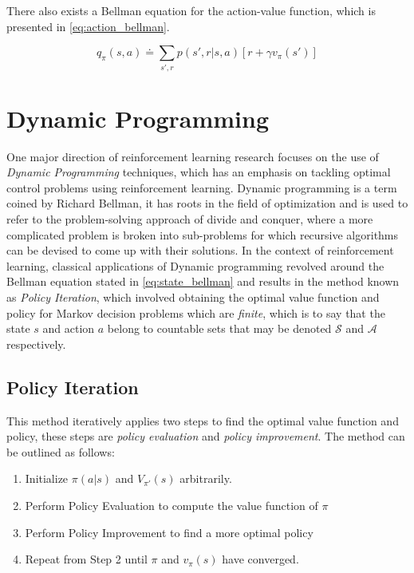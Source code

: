 \documentclass[../report.tex]{subfiles}
\begin{document}
There also exists a Bellman equation for the action-value function, which is presented in \autoref{eq:action_bellman}.

\begin{equation}\label{eq:action_bellman}
    q_{\pi}(s,a) \doteq \sum\limits_{s', r} p(s', r|s, a)[r + \gamma v_{\pi}(s')] 
\end{equation}

\section{Dynamic Programming}

One major direction of reinforcement learning research focuses on the use of \textit{Dynamic Programming} techniques, which has an emphasis on tackling optimal control problems using reinforcement learning\cite{rl_and_dp}. Dynamic programming is a term coined by Richard Bellman, it has roots in the field of optimization and is used to refer to the problem-solving approach of divide and conquer, where a more complicated problem is broken into sub-problems for which recursive algorithms can be devised to come up with their solutions\cite{dp}. In the context of reinforcement learning, classical applications of Dynamic programming revolved around the Bellman equation stated in \autoref{eq:state_bellman} and results in the method known as \textit{Policy Iteration}, which involved obtaining the optimal value function and policy for Markov decision problems which are \textit{finite}, which is to say that the state $s$ and action $a$ belong to countable sets that may be denoted $\mathcal{S}$ and $\mathcal{A}$ respectively.

\subsection{Policy Iteration}

This method iteratively applies two steps to find the optimal value function and policy, these steps are \textit{policy evaluation} and \textit{policy improvement}. The method can be outlined as follows:

\begin{enumerate}
    \item Initialize $\pi(a|s)$ and $V_{\pi'}(s)$ arbitrarily.
    \item Perform Policy Evaluation to compute the value function of $\pi$
    \item Perform Policy Improvement to find a more optimal policy 
    \item Repeat from Step 2 until $\pi$ and $v_{\pi}(s)$ have converged.
\end{enumerate}
\end{document}
